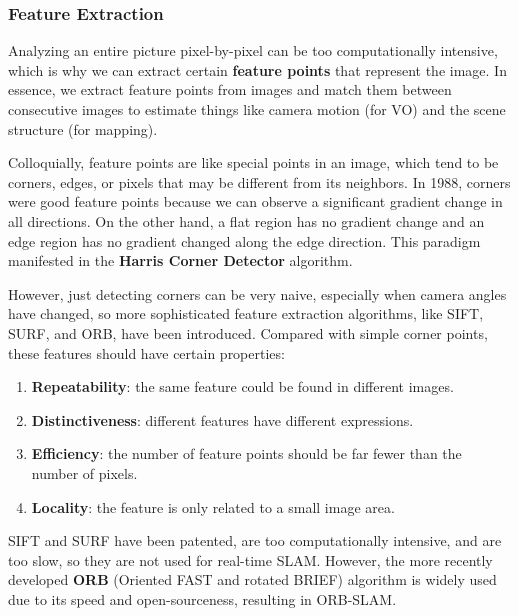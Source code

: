 \documentclass{article}
\newcounter{algo}[section]
\begin{document}
  \subsubsection{Feature Extraction}

  Analyzing an entire picture pixel-by-pixel can be too computationally intensive, which is why we can extract certain \textbf{feature points} that represent the image. In essence, we extract feature points from images and match them between consecutive images to estimate things like camera motion (for VO) and the scene structure (for mapping). 

  Colloquially, feature points are like special points in an image, which tend to be corners, edges, or pixels that may be different from its neighbors. In 1988, corners were good feature points because we can observe a significant gradient change in all directions. On the other hand, a flat region has no gradient change and an edge region has no gradient changed along the edge direction. This paradigm manifested in the \textbf{Harris Corner Detector} algorithm. 

  However, just detecting corners can be very naive, especially when camera angles have changed, so more sophisticated feature extraction algorithms, like SIFT, SURF, and ORB, have been introduced. Compared with simple corner points, these features should have certain properties: 
  \begin{enumerate}
      \item \textbf{Repeatability}: the same feature could be found in different images. 
      \item \textbf{Distinctiveness}: different features have different expressions. 
      \item \textbf{Efficiency}: the number of feature points should be far fewer than the number of pixels. 
      \item \textbf{Locality}: the feature is only related to a small image area. 
  \end{enumerate}
  SIFT and SURF have been patented, are too computationally intensive, and are too slow, so they are not used for real-time SLAM. However, the more recently developed \textbf{ORB} (Oriented FAST and rotated BRIEF) algorithm is widely used due to its speed and open-sourceness, resulting in ORB-SLAM. 
\end{document}
